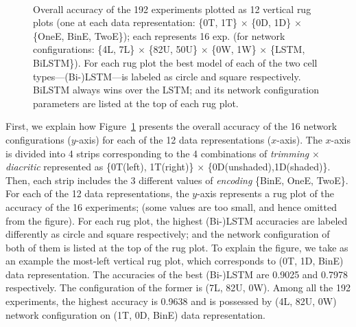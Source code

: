 \documentclass[journal,10pt,twocolumns,letter]{IEEEtran}
\begin{document}
\begin{figure}[!tb]



   \caption{Overall accuracy of the 192 experiments plotted as 12 vertical rug plots (one at each
    data representation: \{0T, 1T\} $\times$ \{0D, 1D\} $\times$ \{OneE, BinE, TwoE\}); each
    represents 16 exp. (for network configurations: \{4L, 7L\} $\times$ \{82U, 50U\} $\times$ \{0W,
    1W\} $\times$ \{LSTM, BiLSTM\}). For each rug plot the best model of each of the two cell
    types---(Bi-)LSTM---is labeled as circle and square respectively. BiLSTM always wins over the
    LSTM; and its network configuration parameters are listed at the top of each rug
    plot.}~\label{fig:ArabicModelsResults}
\end{figure}
First, we explain how Figure~\ref{fig:ArabicModelsResults} presents the overall accuracy of the
16 network configurations ($y$-axis) for each of the 12 data representations ($x$-axis). The
$x$-axis is divided into 4 strips corresponding to the 4 combinations of \textit{trimming} $\times$
\textit{diacritic} represented as \{0T(left), 1T(right)\} $\times$
\{0D(unshaded),1D(shaded)\}. Then, each strip includes the 3 different values of \textit{encoding}
\{BinE, OneE, TwoE\}. For each of the 12 data representations, the
$y$-axis represents a rug plot of the
accuracy of the 16 experiments; (some values are too small, and hence omitted from the
figure)\@. For each rug plot, the highest (Bi-)LSTM accuracies are labeled differently as circle and
square respectively; and the network configuration of both of them is listed at the top of the rug
plot. To explain the figure, we take as an example the most-left vertical rug plot, which
corresponds to (0T, 1D, BinE) data representation. The accuracies of the best (Bi-)LSTM are 0.9025 and
0.7978 respectively. The configuration of the former is (7L, 82U, 0W). Among all the 192
experiments, the highest
accuracy is 0.9638 and is possessed by (4L, 82U, 0W) network configuration on (1T, 0D, BinE) data
representation.
\end{document}
